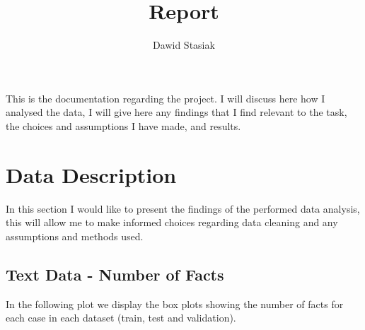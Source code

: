 \documentclass{article}
\author{Dawid Stasiak}
\title{Report}
\begin{document}
\maketitle

\tableofcontents
\newpage

\setlength\parindent{0pt}

This is the documentation regarding the project. I will discuss here
how I analysed the data, I will give here any findings that I find
relevant to the task, the choices and assumptions I have made, and
results.

\section{Data Description}

In this section I would like to present the findings of the performed
data analysis, this will allow me to make informed choices regarding
data cleaning and any assumptions and methods used.

\subsection{Text Data - Number of Facts}

In the following plot we display the box plots showing the number of
facts for each case in each dataset (train, test and validation).
\end{document}
